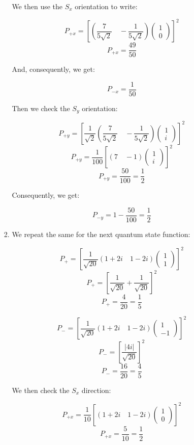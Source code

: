 \begin{enumerate}
\begin{enumerate}
\begin{enumerate}
            We then use the $S_x$ orientation to write:

            $$P_{+x}=\left[\left( \dfrac{7}{5\sqrt{2}}\quad -\dfrac{1}{5\sqrt{2}} \right)\left( \begin{matrix} 1\\ 0\end{matrix} \right)\right]^2$$
            $$\boxed{P_{+x}=\frac{49}{50}}$$

            And, consequently, we get:

            $$\boxed{P_{-x}=\frac{1}{50}}$$

            Then we check the $S_y$ orientation:

            $$P_{+y}=\left[\frac{1}{\sqrt{2}}\left( \dfrac{7}{5\sqrt{2}}\quad -\dfrac{1}{5\sqrt{2}} \right)\left( \begin{matrix} 1\\ i\end{matrix} \right)\right]^2$$
            $$P_{+y}=\frac{1}{100}\left[\left( 7\quad -1\right)\left( \begin{matrix} 1\\ i\end{matrix} \right)\right]^2$$
            $$\boxed{P_{+y}=\frac{50}{100}=\frac{1}{2}}$$

            Consequently, we get:

            $$\boxed{P_{-y}=1-\frac{50}{100}=\frac{1}{2}}$$

          \item We repeat the same for the next quantum state function:

            $$P_+=\left[\frac{1}{\sqrt{20}}\left( 1+2i \quad 1-2i \right)\left( \begin{matrix} 1\\ 1\end{matrix} \right)\right]^2$$
            $$P_+=\left[\frac{1}{\sqrt{20}}+\frac{1}{\sqrt{20}}\right]^2$$
            $$\boxed{P_+=\frac{4}{20}=\frac{1}{5}}$$

            $$P_-=\left[\frac{1}{\sqrt{20}}\left( 1+2i \quad 1-2i \right)\left( \begin{matrix} 1\\ -1\end{matrix} \right)\right]^2$$
            $$P_-=\left[\frac{|4i|}{\sqrt{20}}\right]^2$$
            $$\boxed{P_-=\frac{16}{20}=\frac{4}{5}}$$

            We then check the $S_x$ direction:

            $$P_{+x}=\frac{1}{10}\left[\left( 1+2i \quad 1-2i \right)\left( \begin{matrix} 1\\ 0\end{matrix} \right)\right]^2$$
            $$\boxed{P_{+x}=\frac{5}{10}=\frac{1}{2}}$$


\end{enumerate}
\end{enumerate}
\end{enumerate}
